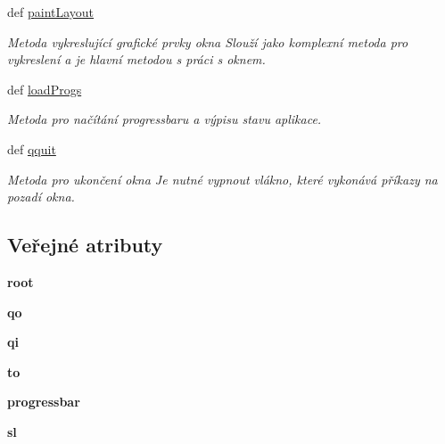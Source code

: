 \begin{DoxyCompactItemize}
def \hyperlink{classmnRepair_1_1App_a6cf047a184898cb1292ae1bd1ccaf13a}{paint\-Layout}
\begin{DoxyCompactList}\small\item\em Metoda vykreslující grafické prvky okna Slouží jako komplexní metoda pro vykreslení a je hlavní metodou s práci s oknem. \end{DoxyCompactList}\item 
def \hyperlink{classmnRepair_1_1App_a963ecf0c9c288defa111ff9500e27674}{load\-Progs}
\begin{DoxyCompactList}\small\item\em Metoda pro načítání progressbaru a výpisu stavu aplikace. \end{DoxyCompactList}\item 
def \hyperlink{classmnRepair_1_1App_aab47754f19f445adbd8723030d1b93ef}{qquit}
\begin{DoxyCompactList}\small\item\em Metoda pro ukončení okna Je nutné vypnout vlákno, které vykonává příkazy na pozadí okna. \end{DoxyCompactList}\end{DoxyCompactItemize}
\subsection*{Veřejné atributy}
\begin{DoxyCompactItemize}
\item 
\hypertarget{classmnRepair_1_1App_a6625cd61e8f5be57f55b7b665d74e371}{{\bfseries root}}\label{da/ddf/classmnRepair_1_1App_a6625cd61e8f5be57f55b7b665d74e371}

\item 
\hypertarget{classmnRepair_1_1App_aedba5e2d1f8af4e1ea8cb8fae90c5beb}{{\bfseries qo}}\label{da/ddf/classmnRepair_1_1App_aedba5e2d1f8af4e1ea8cb8fae90c5beb}

\item 
\hypertarget{classmnRepair_1_1App_a1892b820ecae78b8c38f303009f8c257}{{\bfseries qi}}\label{da/ddf/classmnRepair_1_1App_a1892b820ecae78b8c38f303009f8c257}

\item 
\hypertarget{classmnRepair_1_1App_ab7bc6c2c656a8c1be4f02456279b4b0d}{{\bfseries to}}\label{da/ddf/classmnRepair_1_1App_ab7bc6c2c656a8c1be4f02456279b4b0d}

\item 
\hypertarget{classmnRepair_1_1App_a60bf34e480b9e94fbc42c14033f5ab6e}{{\bfseries progressbar}}\label{da/ddf/classmnRepair_1_1App_a60bf34e480b9e94fbc42c14033f5ab6e}

\item 
\hypertarget{classmnRepair_1_1App_af80db154ea45d463c153b24e58fadb8b}{{\bfseries sl}}\label{da/ddf/classmnRepair_1_1App_af80db154ea45d463c153b24e58fadb8b}

\end{DoxyCompactItemize}


